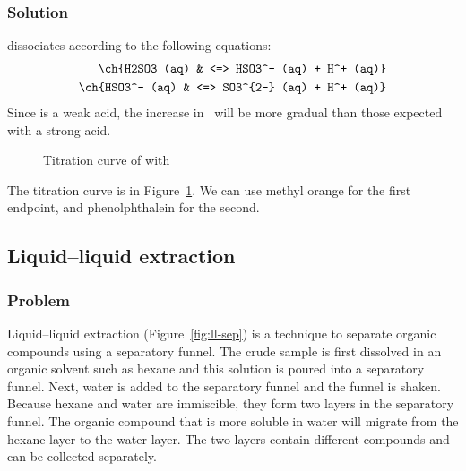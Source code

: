 \documentclass[12pt, a4paper, twoside]{pancake-book}
\begin{document}
\subsubsection{Solution}
 dissociates according to the following equations:
\begin{align*}
	\ch{H2SO3 (aq)  & <=> HSO3^- (aq) + H^+ (aq)}   \\
	\ch{HSO3^- (aq) & <=> SO3^{2-} (aq) + H^+ (aq)}
\end{align*}
Since  is a weak acid, the increase in \pH\ will be more gradual
than those expected with a strong acid.
\begin{figure}[htpb]
	\centering
	\caption{Titration curve of  with }
	\label{fig:titration-h2so3}
\end{figure}

The titration curve is in Figure~\ref{fig:titration-h2so3}. We can use {\color{accent}
		methyl orange} for the first endpoint, and {\color{accent} phenolphthalein} for the second.

\subsection{Liquid--liquid extraction}
\subsubsection{Problem}
Liquid--liquid extraction (Figure~\ref{fig:ll-sep}) is a technique to separate
organic compounds using a separatory funnel. The crude sample is first dissolved
in an organic solvent such as hexane and this solution is poured into a separatory funnel.
Next, water is added to the separatory funnel and the funnel is shaken.
Because hexane and water are immiscible, they form two layers in the
separatory funnel. The organic compound that is more soluble in water will migrate
from the hexane layer to the water layer. The two layers contain different
compounds and can be collected separately.
\end{document}
